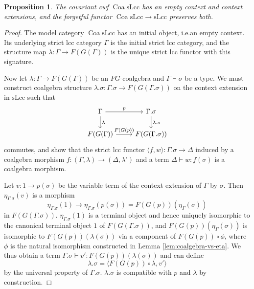 \documentclass[a4paper]{article}
\newtheorem{proposition}[theorem]{Proposition}
\theoremstyle{remark}
\theoremstyle{definition}
\begin{document}
\begin{proposition}
  \label{prop:coa-slcc-exts}
  The covariant cwf $\operatorname{Coa} \mathrm{sLcc}$ has an empty context and context extensions, and the forgetful functor $\operatorname{Coa} \mathrm{sLcc} \rightarrow \mathrm{sLcc}$ preserves both.
\end{proposition}
\begin{proof}
  The model category $\operatorname{Coa} \mathrm{sLcc}$ has an initial object, i.e.\@ an empty context.
  Its underlying strict lcc category $\Gamma$ is the initial strict lcc category, and the structure map $\lambda : \Gamma \rightarrow F(G(\Gamma))$ is the unique strict lcc functor with this signature.

  Now let $\lambda : \Gamma \rightarrow F(G(\Gamma))$ be an $FG$-coalgebra and $\Gamma \vdash \sigma$ be a type.
  We must construct coalgebra structure $\lambda.\sigma : \Gamma.\sigma \rightarrow F(G(\Gamma.\sigma))$ on the context extension in $\mathrm{sLcc}$ such that
  \begin{equation}
    \begin{tikzcd}
      \Gamma \arrow[r, "p"] \arrow[d, "\lambda"] & \Gamma.\sigma \arrow[d, "\lambda.\sigma"] \\
      F(G(\Gamma)) \arrow[r, "F(G(p))"] & F(G(\Gamma.\sigma))
    \end{tikzcd}
  \end{equation}
  commutes, and show that the strict lcc functor $\langle f, w \rangle : \Gamma.\sigma \rightarrow \Delta$ induced by a coalgebra morphism $f : (\Gamma, \lambda) \rightarrow (\Delta, \lambda')$ and a term $\Delta \vdash w : f(\sigma)$ is a coalgebra morphism.

  Let $v : 1 \rightarrow p(\sigma)$ be the variable term of the context extension of $\Gamma$ by $\sigma$.
  Then $\eta_{\Gamma.\sigma}(v)$ is a morphism
  \begin{equation}
    \eta_{\Gamma.\sigma}(1) \rightarrow \eta_{\Gamma.\sigma}(p(\sigma)) = F(G(p))(\eta_\Gamma(\sigma))
  \end{equation}
  in $F(G(\Gamma.\sigma))$.
  $\eta_{\Gamma.\sigma}(1)$ is a terminal object and hence uniquely isomorphic to the canonical terminal object $1$ of $F(G(\Gamma.\sigma))$, and $F(G(p))(\eta_\Gamma(\sigma))$ is isomorphic to $F(G(p))(\lambda(\sigma))$ via a component of $F(G(p)) \circ \phi$, where $\phi$ is the natural isomorphism constructed in Lemma \ref{lem:coalgebra-vs-eta}.
  We thus obtain a term $\Gamma.\sigma \vdash v' : F(G(p))(\lambda(\sigma))$ and can define
  \begin{equation}
    \lambda.\sigma = \langle F(G(p)) \circ \lambda, v' \rangle
  \end{equation}
  by the universal property of $\Gamma.\sigma$.
  $\lambda.\sigma$ is compatible with $p$ and $\lambda$ by construction.


\end{proof}
\end{document}
